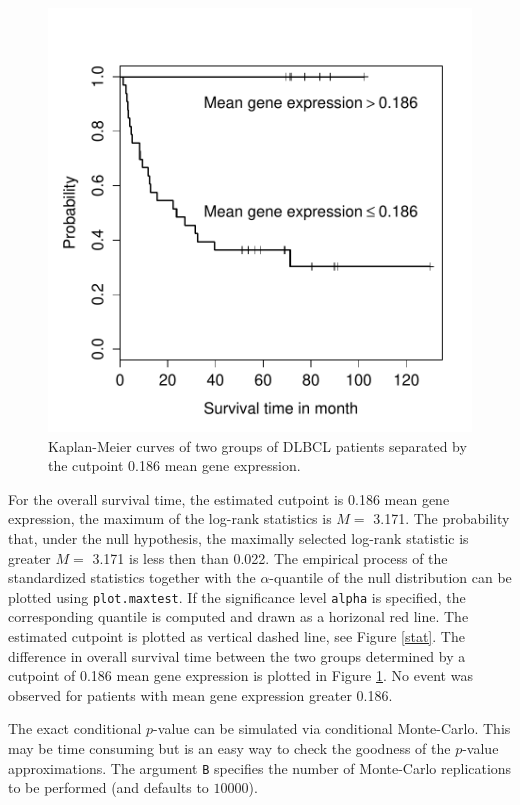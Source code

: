 \documentclass{article}
\begin{document}
\begin{figure}[t]
\begin{center}
\includegraphics{maxstat-DLBCL-fig2}
\caption{Kaplan-Meier curves of two groups of DLBCL patients separated by the
cutpoint 0.186 mean gene expression. \label{surv}}
\end{center}
\end{figure}


For the overall survival time, the estimated cutpoint is
0.186 mean gene
expression, the maximum of the log-rank statistics is $M =$
3.171. The
probability that, under the null hypothesis, the maximally selected log-rank
statistic is greater $M =$
3.171 is less then than
0.022. 
The empirical process of the standardized
statistics together with the $\alpha$-quantile of the null distribution 
can be plotted using \texttt{plot.maxtest}. 
If the significance level \texttt{alpha} is specified, 
the corresponding quantile is computed and drawn
as a horizonal red line. 
The estimated cutpoint is plotted as vertical dashed line, see Figure
\ref{stat}. 
The difference in overall survival time between the two groups determined by
a cutpoint of 0.186 mean gene expression is plotted in Figure
\ref{surv}. No event was observed for patients with mean gene expression
greater 0.186.

The exact conditional $p$-value can be simulated via conditional
Monte-Carlo. This may be time consuming but is an easy way to check the goodness of
the $p$-value approximations. The argument \texttt{B} specifies
the number of Monte-Carlo replications to be performed (and defaults to
$10000$).
\end{document}
